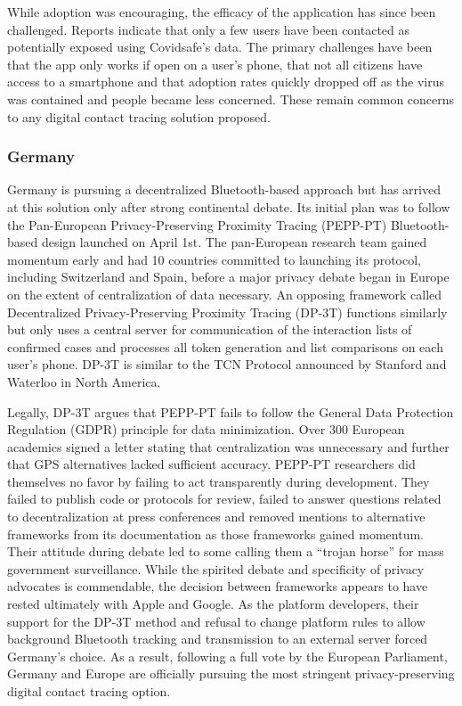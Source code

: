 \documentclass{article}
\begin{document}
While adoption was encouraging, the efficacy of the application has since been challenged. Reports indicate that only a few users have been contacted as potentially exposed using Covidsafe's data. The primary challenges have been that the app only works if open on a user's phone, that not all citizens have access to a smartphone and that adoption rates quickly dropped off as the virus was contained and people became less concerned. These remain common concerns to any digital contact tracing solution proposed.

\subsubsection{Germany}
Germany is pursuing a decentralized Bluetooth-based approach but has arrived at this solution only after strong continental debate\cite{PEPPPTvsDP3T}. Its initial plan was to follow the Pan-European Privacy-Preserving Proximity Tracing (PEPP-PT) Bluetooth-based design launched on April 1st\cite{PEPPPTdocs}. The pan-European research team gained momentum early and had 10 countries committed to launching its protocol, including Switzerland and Spain, before a major privacy debate began in Europe on the extent of centralization of data necessary. An opposing framework called Decentralized Privacy-Preserving Proximity Tracing (DP-3T) functions similarly but only uses a central server for communication of the interaction lists of confirmed cases and processes all token generation and list comparisons on each user’s phone\cite{DP3Tdocs}. DP-3T is similar to the TCN Protocol announced by Stanford and Waterloo in North America. 

Legally, DP-3T argues that PEPP-PT fails to follow the General Data Protection Regulation (GDPR) principle for data minimization. Over 300 European academics signed a letter stating that centralization was unnecessary and further that GPS alternatives lacked sufficient accuracy\cite{ContactTracingStatement}. PEPP-PT researchers did themselves no favor by failing to act transparently during development. They failed to publish code or protocols for review, failed to answer questions related to decentralization at press conferences and removed mentions to alternative frameworks from its documentation as those frameworks gained momentum. Their attitude during debate led to some calling them a “trojan horse” for mass government surveillance\cite{StandardsFight}. While the spirited debate and specificity of privacy advocates is commendable, the decision between frameworks appears to have rested ultimately with Apple and Google. As the platform developers, their support for the DP-3T method and refusal to change platform rules to allow background Bluetooth tracking and transmission to an external server forced Germany’s choice. As a result, following a full vote by the European Parliament, Germany and Europe are officially pursuing the most stringent privacy-preserving digital contact tracing option\cite{EUCOVIDapps}. 
\end{document}
